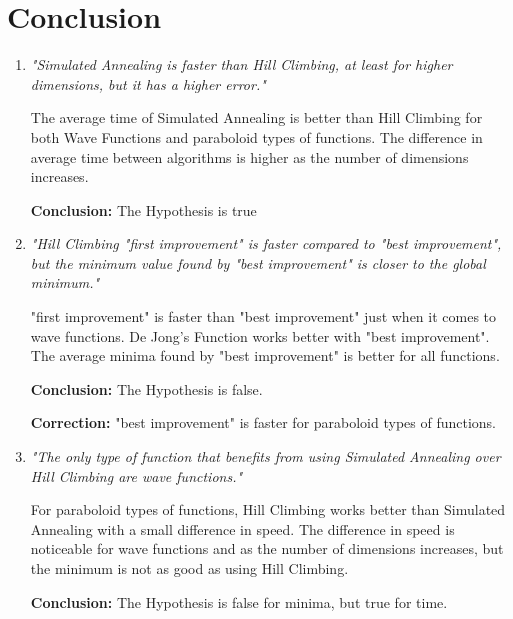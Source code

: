 \documentclass{article}
\newcommand{\smallSpace}{\vspace{0.3cm}}
\begin{document}
\section{Conclusion}
\begin{enumerate}
    \item \textit{"Simulated Annealing is faster than Hill Climbing, at least for higher dimensions, but it has a higher error."}
    
    The average time of Simulated Annealing is better than Hill Climbing for both Wave Functions and paraboloid types of functions.
    The difference in average time between algorithms is higher as the number of dimensions increases.
    
    \textbf{Conclusion:} The Hypothesis is true
    \smallSpace
    \item \textit{"Hill Climbing "first improvement" is faster compared to "best improvement", but the minimum value found by "best improvement" is closer to the global minimum."}
    
    "first improvement" is faster than "best improvement" just when it comes to wave functions. De Jong's Function works better with "best improvement".
    The average minima found by "best improvement" is better for all functions.
    
    \textbf{Conclusion:} The Hypothesis is false.
    
    \textbf{Correction:} "best improvement" is faster for paraboloid types of functions.
    \smallSpace
    \item \textit{"The only type of function that benefits from using Simulated Annealing over Hill Climbing are wave functions."}
    
    For paraboloid types of functions, Hill Climbing works better than Simulated Annealing with a small difference in speed.
    The difference in speed is noticeable for wave functions and as the number of dimensions increases, but the minimum is not as good as using Hill Climbing.
    
    \textbf{Conclusion:} The Hypothesis is false for minima, but true for time.
    
    \smallSpace
\end{enumerate}



\end{document}

